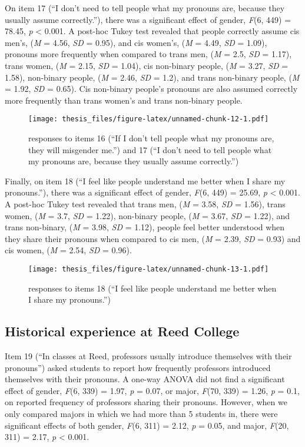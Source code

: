 \documentclass[12pt,twoside]{reedthesis}
\begin{document}
On item 17 (``I don't need to tell people what my pronouns are, because they usually assume correctly.''), there was a significant effect of gender, \emph{F}(6, 449) = 78.45, \emph{p} \textless{} 0.001. A post-hoc Tukey test revealed that people correctly assume cis men's, (\emph{M} = 4.56, \emph{SD} = 0.95), and cis women's, (\emph{M} = 4.49, \emph{SD} = 1.09), pronouns more frequently when compared to trans men, (\emph{M} = 2.5, \emph{SD} = 1.17), trans women, (\emph{M} = 2.15, \emph{SD} = 1.04), cis non-binary people, (\emph{M} = 3.27, \emph{SD} = 1.58), non-binary people, (\emph{M} = 2.46, \emph{SD} = 1.2), and trans non-binary people, (\emph{M} = 1.92, \emph{SD} = 0.65). Cis non-binary people's pronouns are also assumed correctly more frequently than trans women's and trans non-binary people.
\begin{figure}
\centering
\texttt{[image: thesis\_files/figure-latex/unnamed-chunk-12-1.pdf]}
\caption{\label{fig:unnamed-chunk-12}responses to items 16 (``If I don't tell people what my pronouns are, they will misgender me.'') and 17 (``I don't need to tell people what my pronouns are, because they usually assume correctly.'')}
\end{figure}
Finally, on item 18 (``I feel like people understand me better when I share my pronouns.''), there was a significant effect of gender, \emph{F}(6, 449) = 25.69, \emph{p} \textless{} 0.001. A post-hoc Tukey test revealed that trans men, (\emph{M} = 3.58, \emph{SD} = 1.56), trans women, (\emph{M} = 3.7, \emph{SD} = 1.22), non-binary people, (\emph{M} = 3.67, \emph{SD} = 1.22), and trans non-binary, (\emph{M} = 3.98, \emph{SD} = 1.12), people feel better understood when they share their pronouns when compared to cis men, (\emph{M} = 2.39, \emph{SD} = 0.93) and cis women, (\emph{M} = 2.54, \emph{SD} = 0.96).
\begin{figure}
\centering
\texttt{[image: thesis\_files/figure-latex/unnamed-chunk-13-1.pdf]}
\caption{\label{fig:unnamed-chunk-13}responses to items 18 (``I feel like people understand me better when I share my pronouns.'')}
\end{figure}
\hypertarget{historical-experience-at-reed-college}{%
\subsection{Historical experience at Reed College}\label{historical-experience-at-reed-college}}

Item 19 (``In classes at Reed, professors usually introduce themselves with their pronouns'') asked students to report how frequently professors introduced themselves with their pronouns. A one-way ANOVA did not find a significant effect of gender, \emph{F}(6, 339) = 1.97, \emph{p} = 0.07, or major, \emph{F}(70, 339) = 1.26, \emph{p} = 0.1, on reported frequency of professors sharing their pronouns. However, when we only compared majors in which we had more than 5 students in, there were significant effects of both gender, \emph{F}(6, 311) = 2.12, \emph{p} = 0.05, and major, \emph{F}(20, 311) = 2.17, \emph{p} \textless{} 0.001.
\end{document}
